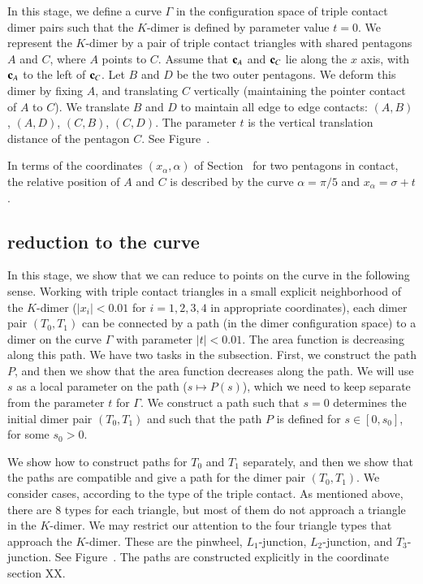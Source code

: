 In this stage, we define a curve $\Gamma$ in the configuration space of triple contact dimer pairs such that the $K$-dimer
is defined by parameter value $t=0$.  We represent the $K$-dimer by a pair of triple contact triangles with shared pentagons
$A$ and $C$, where $A$ points to $C$.  Assume that ${\mathbf c}_A$ and ${\mathbf c}_C$ lie along the $x$ axis, with ${\mathbf c}_A$ to the left
of ${\mathbf c}_C$.  Let $B$ and $D$ be the two outer pentagons.  We deform this dimer by fixing $A$,
and translating $C$ vertically (maintaining the pointer contact of $A$ to $C$).  We translate $B$ and $D$ to maintain
all edge to edge contacts: $(A,B)$, $(A,D)$, $(C,B)$, $(C,D)$.   The parameter $t$ is the vertical translation distance of the pentagon $C$.
See Figure~.

In terms of the coordinates $(x_\alpha,\alpha)$ of Section~ for two pentagons in contact, the relative position of $A$ and $C$
is described by the curve $\alpha=\pi/5$ and $x_\alpha = \sigma+t$.


\subsection{reduction to the curve}

In this stage, we show that we can reduce to points on the curve in the following sense.
Working with triple contact triangles in a small explicit neighborhood of the
$K$-dimer ($|x_i|<0.01$ for $i=1,2,3,4$ in appropriate coordinates),
each dimer pair $(T_0,T_1)$ can be connected by a path (in the dimer configuration
space) to a dimer on the curve $\Gamma$ with parameter $|t|<0.01$.
The area function is decreasing along this path.
We have two tasks in the subsection.  First, we construct the path $P$, and 
then we show that the area function decreases along the path.  We will use
$s$ as a local parameter on the path ($s\mapsto P(s)$), 
which we need to keep separate from
the parameter $t$ for $\Gamma$.  We construct a path such that $s=0$ determines the
initial dimer pair $(T_0,T_1)$ and such that the path $P$ is defined for $s\in [0,s_0]$, for some $s_0>0$.

We show how to construct paths for $T_0$ and $T_1$ separately, and then
we show that the paths are compatible and give a path for the dimer pair $(T_0,T_1)$.
We consider cases, according to the type of the triple contact.
As mentioned above, there are $8$ types for each triangle, but most of them do not
approach a triangle in the $K$-dimer.  We may restrict our attention
to the four triangle types that approach the $K$-dimer.   These are the pinwheel, $L_1$-junction,
$L_2$-junction, and $T_3$-junction.  See Figure~.
The paths are constructed explicitly in the coordinate section XX.

